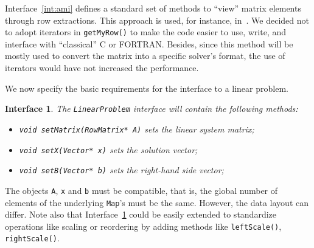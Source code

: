 \documentclass[acmtoms,acmnow]{acmtrans2m}
\newtheorem{interface}{Interface}[section]
\begin{document}
Interface~\ref{int:ami} defines a standard set of methods to
``view'' matrix elements through row extractions. This approach is
used, for instance,
in~\cite{Epetra-Ref-Guide,ml-guide,duff02overview,lujan00oolala}. We
decided not to adopt iterators in {\tt getMyRow()} to make the code
easier to use,
    write, and interface with ``classical'' C or FORTRAN.
Besides, since this method will be mostly used to convert the matrix
into a specific solver's format, the use of iterators would have not
increased the performance.

\smallskip

We now specify the basic requirements for the interface to a linear problem.
\begin{interface}
\label{int:lp}
The {\tt LinearProblem} interface
will contain the following methods:
\begin{itemize}
\item \verb!void setMatrix(RowMatrix* A)! sets the linear system matrix;
\item \verb!void setX(Vector* x)! sets the solution vector;
\item \verb!void setB(Vector* b)! sets the right-hand side vector;
\end{itemize}
\end{interface}
The objects \verb!A!, \verb!x! and \verb!b! must be compatible, that
is, the global number of elements of the underlying {\tt Map}'s must
be the same. However, the data layout can differ. Note also that
Interface~\ref{int:lp} could be easily extended to standardize
operations like scaling or reordering by adding methods like
\verb!leftScale()!, \verb!rightScale()!.



\smallskip
\end{document}
